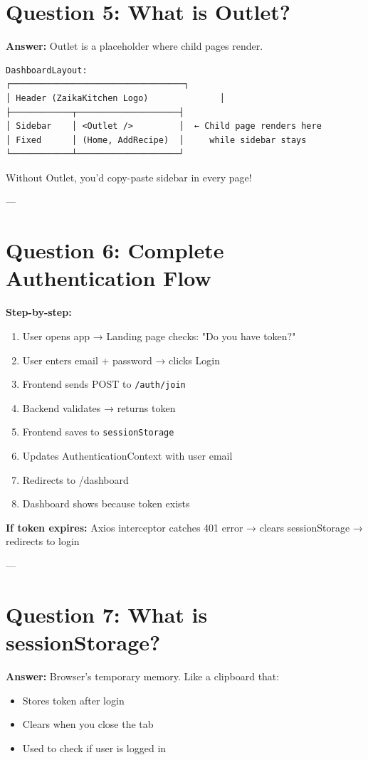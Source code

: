 \documentclass[11pt]{article}
\begin{document}
\section*{Question 5: What is Outlet?}

\textbf{Answer:} Outlet is a placeholder where child pages render.

\begin{lstlisting}
DashboardLayout:
┌──────────────────────────────────┐
│ Header (ZaikaKitchen Logo)              │
├────────────┬────────────────────┤
│ Sidebar    │ <Outlet />         │  ← Child page renders here
│ Fixed      │ (Home, AddRecipe)  │     while sidebar stays
└────────────┴────────────────────┘
\end{lstlisting}

Without Outlet, you'd copy-paste sidebar in every page!

---

\section*{Question 6: Complete Authentication Flow}

\textbf{Step-by-step:}

\begin{enumerate}
    \item User opens app → Landing page checks: "Do you have token?"
    \item User enters email + password → clicks Login
    \item Frontend sends POST to \texttt{/auth/join}
    \item Backend validates → returns token
    \item Frontend saves to \texttt{sessionStorage}
    \item Updates AuthenticationContext with user email
    \item Redirects to /dashboard
    \item Dashboard shows because token exists
\end{enumerate}

\textbf{If token expires:} Axios interceptor catches 401 error → clears sessionStorage → redirects to login

---

\section*{Question 7: What is sessionStorage?}

\textbf{Answer:} Browser's temporary memory. Like a clipboard that:
\begin{itemize}
    \item Stores token after login
    \item Clears when you close the tab
    \item Used to check if user is logged in
\end{itemize}
\end{document}
